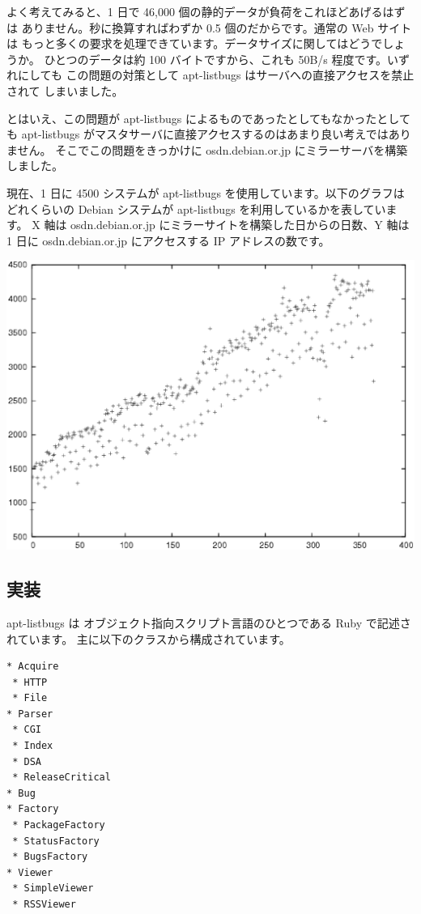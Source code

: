 \documentclass[mingoth,a4paper]{jsarticle}
\begin{document}
よく考えてみると、1 日で 46,000 個の静的データが負荷をこれほどあげるはずは
ありません。秒に換算すればわずか 0.5 個のだからです。通常の Web サイトは
もっと多くの要求を処理できています。データサイズに関してはどうでしょうか。
ひとつのデータは約 100 バイトですから、これも 50B/s 程度です。いずれにしても
この問題の対策として apt-listbugs はサーバへの直接アクセスを禁止されて
しまいました。

とはいえ、この問題が apt-listbugs によるものであったとしてもなかったとしても
apt-listbugs がマスタサーバに直接アクセスするのはあまり良い考えではありません。
そこでこの問題をきっかけに osdn.debian.or.jp にミラーサーバを構築しました。

現在、1 日に 4500 システムが apt-listbugs を使用しています。以下のグラフは
どれくらいの Debian システムが apt-listbugs を利用しているかを表しています。
X 軸は osdn.debian.or.jp にミラーサイトを構築した日からの日数、Y 軸は
1 日に osdn.debian.or.jp にアクセスする IP アドレスの数です。

\begin{center}
\includegraphics[scale=0.5]{image200510/user.eps}
\end{center}

\subsection{実装}

apt-listbugs は オブジェクト指向スクリプト言語のひとつである Ruby で記述されています。
主に以下のクラスから構成されています。

\begin{verbatim}
* Acquire
 * HTTP
 * File
* Parser
 * CGI
 * Index
 * DSA
 * ReleaseCritical
* Bug
* Factory
 * PackageFactory
 * StatusFactory
 * BugsFactory
* Viewer
 * SimpleViewer
 * RSSViewer
\end{verbatim}
\end{document}
